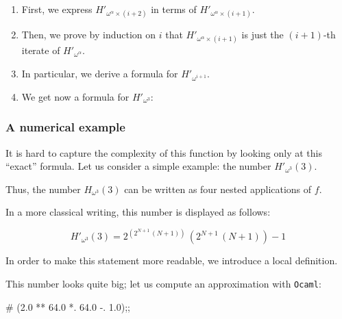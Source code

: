 \begin{enumerate}
\item First,  we express $H'_{\omega^\alpha \times (i+2)}$ in terms of
$H'_{\omega^\alpha \times (i+1)}$.




\item
Then, we prove by induction on $i$ that $H'_{\omega^\alpha \times (i+1)}$ is just the
$(i+1)$-th iterate of $H'_{\omega^\alpha}$.



\item In particular, we derive a formula for $H'_{\omega^{i+1}}$.


  

\item We get now a  formula for $H'_{\omega^3}$:


\end{enumerate}



\subsubsection{A numerical example}
\label{sect:bignum}

It is hard to capture the complexity of this function by looking only at this
``exact'' formula. 
Let us consider a simple example: the number $H'_{\omega^3}(3)$.  




Thus, the number $H_{\omega^3}(3)$ can be written as four nested applications of $f$.
 



In a more classical writing, this number is displayed as follows:

{\Large
$$
H'_{\omega^3}(3) =  2 ^ {(2 ^ {N + 1} \, (N+1) )}   \,  (2 ^ {N+1} \, ( N +1) ) - 1
$$
}


In order to make this statement more readable, we introduce a local definition.




This number looks quite big; let us compute an approximation with \texttt{Ocaml}:


\begin{Coqsrc}
# (2.0 ** 64.0 *. 64.0 -. 1.0);; 
\end{Coqsrc}

